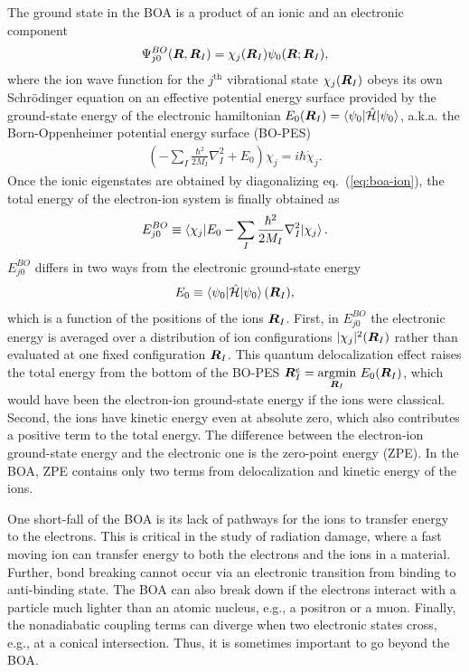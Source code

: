 The ground state in the BOA is a product of an ionic and an electronic component
\begin{align} \label{eq:intro-boa-product}
\Psi_{j 0}^{BO}(\boldsymbol{R},\boldsymbol{R}_I) = \chi_j(\boldsymbol{R}_I) \psi_0(\boldsymbol{R};\boldsymbol{R}_I),
\end{align}
where the ion wave function for the $j^{\text{th}}$ vibrational state $\chi_j(\boldsymbol{R}_I)$ obeys its own Schr\"odinger equation on an effective potential energy surface provided by the ground-state energy of the electronic hamiltonian $E_0(\boldsymbol{R}_I) = \braket{\psi_0|\hat{\mathcal{H}}|\psi_0}$, a.k.a. the Born-Oppenheimer potential energy surface (BO-PES)
\begin{align} \label{eq:boa-ion}
\left(-\sum_I\frac{\hbar^2}{2M_I}\nabla^2_I+E_0\right)\chi_j = i\hbar\dot{\chi}_j.
\end{align}
Once the ionic eigenstates are obtained by diagonalizing eq.~(\ref{eq:boa-ion}), the total energy of the electron-ion system is finally obtained as
\begin{align}
E_{j0}^{BO} \equiv \braket{\chi_j| E_0 -\sum_I\frac{\hbar^2}{2M_I}\nabla^2_I |\chi_j}.
\end{align}
$E_{j0}^{BO}$ differs in two ways from the electronic ground-state energy
\begin{align}
E_0 \equiv \braket{\psi_0|\hat{\mathcal{H}}|\psi_0}(\boldsymbol{R}_I),
\end{align}
which is a function of the positions of the ions $\boldsymbol{R}_I$. First, in $E_{j0}^{BO}$ the electronic energy is averaged over a distribution of ion configurations $\vert\chi_j\vert^2(\boldsymbol{R}_I)$ rather than evaluated at one fixed configuration $\boldsymbol{R}_I$. This quantum delocalization effect raises the total energy from the bottom of the BO-PES $\boldsymbol{R}_I^e=\underset{\boldsymbol{R}_I}{\text{argmin}}~E_0(\boldsymbol{R}_I)$, which would have been the electron-ion ground-state energy if the ions were classical. Second, the ions have kinetic energy even at absolute zero, which also contributes a positive term to the total energy.
The difference between the electron-ion ground-state energy and the electronic one is the zero-point energy (ZPE). In the BOA, ZPE contains only two terms from delocalization and kinetic energy of the ions.

One short-fall of the BOA is its lack of pathways for the ions to transfer energy to the electrons. This is critical in the study of radiation damage, where a fast moving ion can transfer energy to both the electrons and the ions in a material. Further, bond breaking cannot occur via an electronic transition from binding to anti-binding state. The BOA can also break down if the electrons interact with a particle much lighter than an atomic nucleus, e.g., a positron or a muon. Finally, the nonadiabatic coupling terms can diverge when two electronic states cross, e.g., at a conical intersection. Thus, it is sometimes important to go beyond the BOA.

